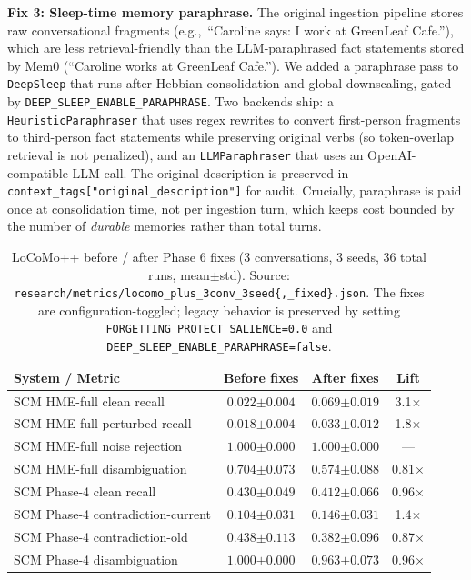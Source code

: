 \documentclass[11pt,twocolumn]{article}
\begin{document}
\textbf{Fix 3: Sleep-time memory paraphrase.} The original ingestion pipeline stores raw conversational fragments (e.g.,\ ``Caroline says: I work at GreenLeaf Cafe.''), which are less retrieval-friendly than the LLM-paraphrased fact statements stored by Mem0 (``Caroline works at GreenLeaf Cafe.''). We added a paraphrase pass to \texttt{DeepSleep} that runs after Hebbian consolidation and global downscaling, gated by \texttt{DEEP\_SLEEP\_ENABLE\_PARAPHRASE}. Two backends ship: a \texttt{HeuristicParaphraser} that uses regex rewrites to convert first-person fragments to third-person fact statements while preserving original verbs (so token-overlap retrieval is not penalized), and an \texttt{LLMParaphraser} that uses an OpenAI-compatible LLM call. The original description is preserved in \texttt{context\_tags["original\_description"]} for audit. Crucially, paraphrase is paid once at consolidation time, not per ingestion turn, which keeps cost bounded by the number of \emph{durable} memories rather than total turns.

\begin{table}[t]
\centering
\caption{LoCoMo++ before / after Phase 6 fixes (3 conversations, 3 seeds, 36 total runs, mean$\pm$std). Source: \texttt{research/metrics/locomo\_plus\_3conv\_3seed\{,\_fixed\}.json}. The fixes are configuration-toggled; legacy behavior is preserved by setting \texttt{FORGETTING\_PROTECT\_SALIENCE=0.0} and \texttt{DEEP\_SLEEP\_ENABLE\_PARAPHRASE=false}.}
\label{tab:phase6_fixes}
{\footnotesize
\begin{tabular}{@{}lccc@{}}
\toprule
\textbf{System / Metric} & \textbf{Before fixes} & \textbf{After fixes} & \textbf{Lift} \\
\midrule
SCM HME-full clean recall            & $0.022{\scriptstyle\pm0.004}$ & $\mathbf{0.069{\scriptstyle\pm0.019}}$ & 3.1$\times$ \\
SCM HME-full perturbed recall        & $0.018{\scriptstyle\pm0.004}$ & $\mathbf{0.033{\scriptstyle\pm0.012}}$ & 1.8$\times$ \\
SCM HME-full noise rejection         & $1.000{\scriptstyle\pm0.000}$ & $1.000{\scriptstyle\pm0.000}$ & --- \\
SCM HME-full disambiguation          & $0.704{\scriptstyle\pm0.073}$ & $0.574{\scriptstyle\pm0.088}$ & 0.81$\times$ \\
SCM Phase-4 clean recall             & $0.430{\scriptstyle\pm0.049}$ & $0.412{\scriptstyle\pm0.066}$ & 0.96$\times$ \\
SCM Phase-4 contradiction-current    & $0.104{\scriptstyle\pm0.031}$ & $\mathbf{0.146{\scriptstyle\pm0.031}}$ & 1.4$\times$ \\
SCM Phase-4 contradiction-old        & $0.438{\scriptstyle\pm0.113}$ & $0.382{\scriptstyle\pm0.096}$ & 0.87$\times$ \\
SCM Phase-4 disambiguation           & $1.000{\scriptstyle\pm0.000}$ & $0.963{\scriptstyle\pm0.073}$ & 0.96$\times$ \\
\bottomrule
\end{tabular}}
\end{table}
\end{document}

